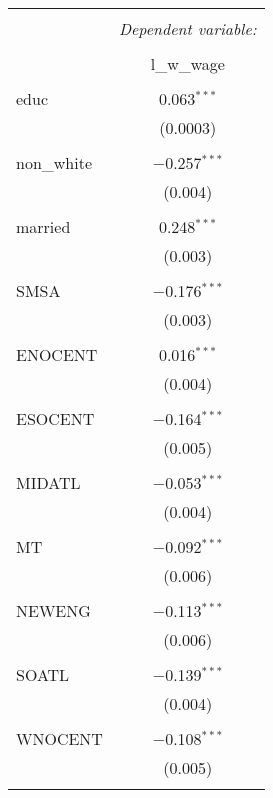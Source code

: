 
\begin{table}[!htbp] \centering 
  \caption{} 
  \label{} 
\begin{tabular}{@{\extracolsep{5pt}}lc} 
\\[-1.8ex]\hline 
\hline \\[-1.8ex] 
 & \multicolumn{1}{c}{\textit{Dependent variable:}} \\ 
\cline{2-2} 
\\[-1.8ex] & l\_w\_wage \\ 
\hline \\[-1.8ex] 
 educ & 0.063$^{***}$ \\ 
  & (0.0003) \\ 
  & \\ 
 non\_white & $-$0.257$^{***}$ \\ 
  & (0.004) \\ 
  & \\ 
 married & 0.248$^{***}$ \\ 
  & (0.003) \\ 
  & \\ 
 SMSA & $-$0.176$^{***}$ \\ 
  & (0.003) \\ 
  & \\ 
 ENOCENT & 0.016$^{***}$ \\ 
  & (0.004) \\ 
  & \\ 
 ESOCENT & $-$0.164$^{***}$ \\ 
  & (0.005) \\ 
  & \\ 
 MIDATL & $-$0.053$^{***}$ \\ 
  & (0.004) \\ 
  & \\ 
 MT & $-$0.092$^{***}$ \\ 
  & (0.006) \\ 
  & \\ 
 NEWENG & $-$0.113$^{***}$ \\ 
  & (0.006) \\ 
  & \\ 
 SOATL & $-$0.139$^{***}$ \\ 
  & (0.004) \\ 
  & \\ 
 WNOCENT & $-$0.108$^{***}$ \\ 
  & (0.005) \\ 
  & \\ 

\end{tabular}
\end{table}
